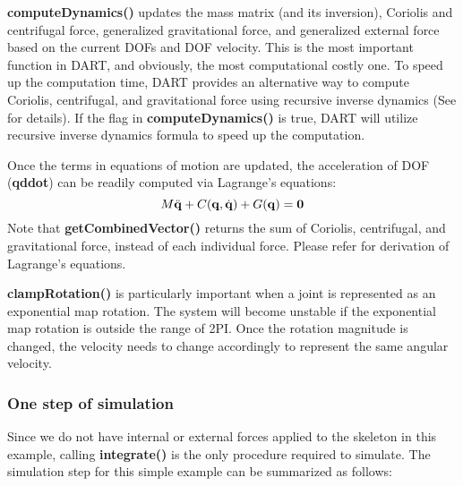\textbf{computeDynamics()} updates the mass matrix (and its
inversion), Coriolis and centrifugal force, generalized gravitational force,
and generalized external force based on the current DOFs and DOF
velocity. This is the most important function in DART, and obviously,
the most computational costly one. To speed up the computation time,
DART provides an alternative way to compute Coriolis, centrifugal, and
gravitational force using recursive inverse dynamics (See
\cite{dynamics-tutorial} for details). If the flag in
\textbf{computeDynamics()} is true, DART will utilize recursive
inverse dynamics formula to speed up the computation.

Once the terms in equations of motion are updated, the acceleration of
DOF (\textbf{qddot}) can be readily computed via Lagrange's equations:
\begin{equation}
M \ddot{\mathbf{q}} + C(\mathbf{q}, \dot{\mathbf{q}}) + G(\mathbf{q}) = \mathbf{0}
\end{equation}
Note that \textbf{getCombinedVector()} returns the sum of Coriolis,
centrifugal, and gravitational force, instead of each individual
force. Please refer \cite{dynamic-tutorial} for derivation of
Lagrange's equations.

\textbf{clampRotation()} is particularly important when a joint is
represented as an exponential map rotation. The system will become
unstable if the exponential map rotation is outside the range of
2PI. Once the rotation magnitude is changed, the velocity needs to
change accordingly to represent the same angular velocity.

\subsubsection{One step of simulation}
Since we do not have internal or external forces applied to the
skeleton in this example, calling \textbf{integrate()} is the only
procedure required to simulate. The simulation step for this simple
example can be summarized as follows:


